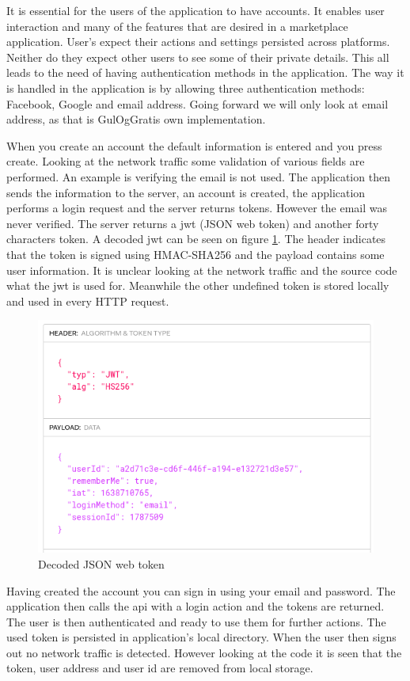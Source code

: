 It is essential for the users of the application to have accounts. It enables user interaction and many of the features that are desired in a marketplace application. User's expect their actions and settings persisted across platforms. Neither do they expect other users to see some of their private details. This all leads to the need of having authentication methods in the application. The way it is handled in the application is by allowing three authentication methods: Facebook, Google and email address. Going forward we will only look at email address, as that is GulOgGratis own implementation. 

When you create an account the default information is entered and you press create. Looking at the network traffic some validation of various fields are performed. An example is verifying the email is not used. The application then sends the information to the server, an account is created, the application performs a login request and the server returns tokens. However the email was never verified. The server returns a jwt (JSON web token) and another forty characters token. A decoded jwt can be seen on figure \ref{fig:jwt_decoded}. The header indicates that the token is signed using HMAC-SHA256 and the payload contains some user information. It is unclear looking at the network traffic and the source code what the jwt is used for. Meanwhile the other undefined token is stored locally and used in every HTTP request.  

\begin{figure}[htbp]
    \centering
    \includegraphics[width=0.7\columnwidth]{../dynamic-analysis/pictures/jwt_decoded.png}
    \caption{Decoded JSON web token}
    \label{fig:jwt_decoded}
\end{figure}

Having created the account you can sign in using your email and password. The application then calls the api with a login action and the tokens are returned. The user is then authenticated and ready to use them for further actions. The used token is persisted in application's local directory. When the user then signs out no network traffic is detected. However looking at the code it is seen that the token, user address and user id are removed from local storage.      


